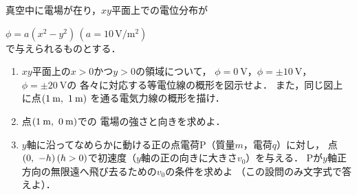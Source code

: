 \documentclass[../../../uem_phy_std_q.tex]{subfiles}
\begin{document}
    真空中に電場が在り，$xy$平面上での電位分布が

    \myspaceb%
    $\displaystyle%
        \phi=a(x^2-y^2)\,(a=10\,\mathrm{V}/\mathrm{m}^2)%
    $\\
    で与えられるものとする．
    
    \begin{enumerate}
        \item%
            $xy$平面上の$x>0$かつ$y>0$の領域について，%
            $\phi=0\:\mathrm{V}$，$\phi=\pm10\:\mathrm{V}$，$\phi=\pm20\:\mathrm{V}$の%
            各々に対応する等電位線の概形を図示せよ．%
            また，同じ図上に点$(1\:\mathrm{m}, \hspace{3.4pt} 1\:\mathrm{m})$%
            を通る電気力線の概形を描け．
        \item%
            点$(1\:\mathrm{m}, \hspace{3.4pt} 0\:\mathrm{m})$での%
            電場の強さと向きを求めよ．
        \item%
            $y$軸に沿ってなめらかに動ける正の点電荷P（質量$m$，電荷$q$）に対し，%
            点$(0, \hspace{3.4pt} -h)\,(h>0)$で初速度（$y$軸の正の向きに大きさ$v_0$）を与える．%
            Pが$y$軸正方向の無限遠へ飛び去るための$v_0$の条件を求めよ%
            （この設問のみ文字式で答えよ）．
    \end{enumerate}
\end{document}
